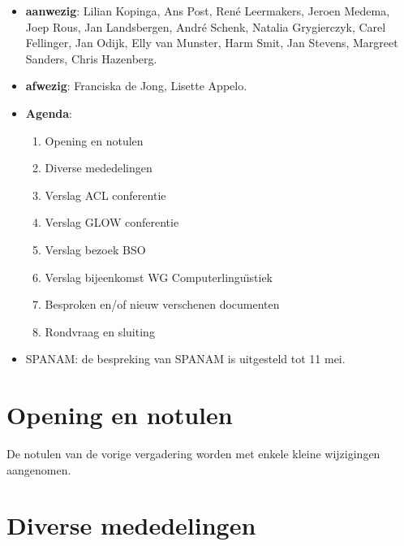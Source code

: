 
   \RosDate{\today}
   \RosSupersedes{-}
   \MakeRosTitle
\begin{itemize}
  \item {\bf aanwezig}: Lilian Kopinga, Ans Post, Ren\'{e} Leermakers, 
             Jeroen Medema, Joep Rous, Jan Landsbergen, Andr\'{e} Schenk, 
             Natalia Grygierczyk, Carel Fellinger, Jan Odijk, 
             Elly van Munster, Harm Smit, Jan Stevens, Margreet Sanders,
             Chris Hazenberg.
  \item {\bf afwezig}: Franciska de Jong, Lisette Appelo.
  \item {\bf Agenda}:
    \begin{enumerate}
       \item Opening en notulen
       \item Diverse mededelingen
       \item Verslag ACL conferentie
       \item Verslag GLOW conferentie
       \item Verslag bezoek BSO
       \item Verslag bijeenkomst WG Computerlingu\"{\i}stiek
       \item Besproken en/of nieuw verschenen documenten
       \item Rondvraag en sluiting
    \end{enumerate}
  \item {SPANAM}: de bespreking van SPANAM is uitgesteld tot 11 mei.
\end{itemize}

\section {Opening en notulen}

De notulen van de vorige vergadering worden met enkele kleine wijzigingen
aangenomen.

\section {Diverse mededelingen}

